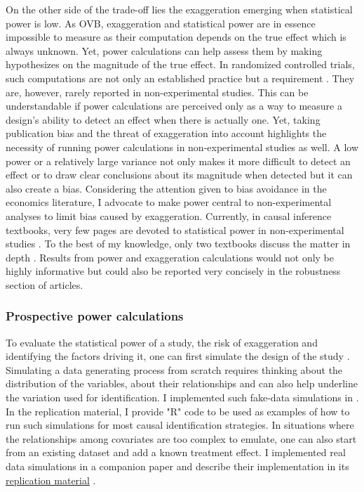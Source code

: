 \documentclass[usletter, 12pt]{article}
\begin{document}
			On the other side of the trade-off lies the exaggeration emerging when statistical power is low. As OVB, exaggeration and statistical power are in essence impossible to measure as their computation depends on the true effect which is always unknown. Yet, power calculations can help assess them by making hypothesizes on the magnitude of the true effect. In randomized controlled trials, such computations are not only an established practice but a requirement \citep{duflo_using_2007, mcconnell_going_2015, athey_econometrics_2016}. They are, however, rarely reported in non-experimental studies. This can be understandable if power calculations are perceived only as a way to measure a design's ability to detect an effect when there is actually one. Yet, taking publication bias and the threat of exaggeration into account highlights the necessity of running power calculations in non-experimental studies as well. A low power or a relatively large variance not only makes it more difficult to detect an effect or to draw clear conclusions about its magnitude when detected but it can also create a bias. Considering the attention given to bias avoidance in the economics literature, I advocate to make power central to non-experimental analyses to limit bias caused by exaggeration. Currently, in causal inference textbooks, very few pages are devoted to statistical power in non-experimental studies \citep{angrist_mostly_2009, angrist_mastering_2014, imbens_causal_2015, cunningham_causal_2021}. To the best of my knowledge, only two textbooks discuss the matter in depth \citep{shadish_experimental_2002, huntington-klein_effect_2021}. Results from power and exaggeration calculations would not only be highly informative but could also be reported very concisely in the robustness section of articles. 
			
			\subsubsection{Prospective power calculations}
						
				To evaluate the statistical power of a study, the risk of exaggeration and identifying the factors driving it, one can first simulate the design of the study \citep{hill_bayesian_2011, gelman_regression_2020, black_simulated_2021}. Simulating a data generating process from scratch requires thinking about the distribution of the variables, about their relationships and can also help underline the variation used for identification. %
			 I implemented such fake-data simulations in . In the replication material, I provide "R" code to be used as examples of how to run such simulations for most causal identification strategies. In situations where the relationships among covariates are too complex to emulate, one can also start from an existing dataset and add a known treatment effect. I implemented real data simulations in a companion paper and describe their implementation in its \href{https://vincentbagilet.github.io/inference_pollution/}{replication material} \citep{bagilet_accurately_2023}. 
			 
\end{document}
